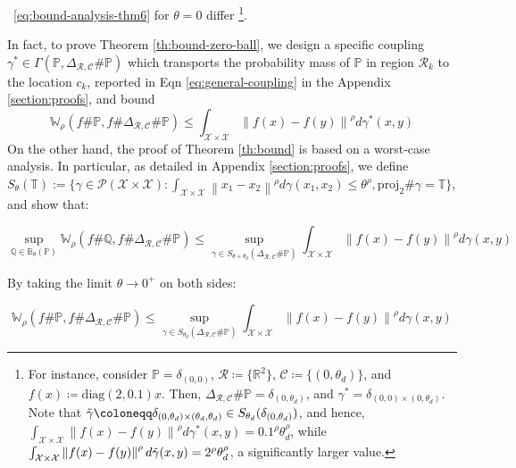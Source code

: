 \documentclass[11pt, a4paper, oneside,reqno]{amsart}
\theoremstyle{plain}
\def\prob{\mathbb{P}}
\def\probQ{\mathbb{Q}}
\def\wasserstein{{\mathbb{W}}}
\newcommand{\norm}[1]{\left\lVert#1\right\rVert}
\def\realNum{{\mathbb{R}}}
\def\sP{{\mathcal{P}}}
\def\sR{{\mathcal{R}}}
\def\sX{{\mathcal{X}}}
\def\bsR{{\bm{\mathcal{R}}}}
\def\bsC{{\bm{\mathcal{C}}}}
\begin{document}
~\eqref{eq:bound-analysis-thm6} for $\theta=0$ differ
\footnote{For instance, consider $\prob = \delta_{(0,0)}$, $\bsR \coloneqq \{ \realNum^2 \}$, $\bsC \coloneqq \{ (0, \theta_d) \}$, and $f(x) \coloneqq \text{diag}(2, 0.1)x$. Then, $\Delta_{\bsR, \bsC}\#\prob = \delta_{(0, \theta_d)}$, and $\gamma^*=\delta_{(0,0)\times(0,\theta_d)}$. Note that $\Tilde{\gamma} \coloneqq \delta_{(0, \theta_d)\times(\theta_d, \theta_d)} \in S_{\theta_d}(\delta_{(0, \theta_d)})$, and hence, $\int_{\sX \times \sX} \norm{f(x)-f(y)}^\rho d\gamma^*(x, y) = 0.1^\rho \theta_d^\rho$, while $\int_{\sX \times \sX} \norm{f(x)-f(y)}^\rho d\Tilde{\gamma}(x, y) = 2^\rho \theta_d^\rho$, a significantly larger value.}.

\iffalse
  In fact, to prove Theorem \ref{th:bound-zero-ball}, we design a specific coupling $\gamma^* \in \Gamma(\prob, \Delta_{\bsR, \bsC}\#\prob)$ which transports the probability mass of $\prob$ in region $\sR_k$ to the location $c_k$, reported in Eqn \eqref{eq:general-coupling} in the Appendix \ref{section:proofs}, and bound
    \begin{equation}\label{eq:bound-analysis-thm6}
        \wasserstein_\rho(f\#\prob, f\#\Delta_{\bsR, \bsC}\#\prob) \leq \int_{\sX \times \sX} \norm{f(x)-f(y)}^\rho d\gamma^*(x, y)
    \end{equation}
    On the other hand, the proof of Theorem \ref{th:bound} is based on a worst-case analysis. In particular, as detailed in Appendix \ref{section:proofs}, we define $ S_\theta(\mathbb{T}) := \Big\{ \gamma \in \sP(\sX \times \sX) : \int_{\sX \times \sX} \norm{x_1 - x_2}^\rho d\gamma(x_1, x_2) \leq \theta^\rho, \text{proj}_2 \# \gamma = \mathbb{T} \Big\}$, and show that:

    \begin{equation*}
        \sup_{\probQ \in \mathbb{B}_{\theta}(\prob)}\wasserstein_\rho(f\#\probQ, f\#\Delta_{\bsR, \bsC}\#\prob) \leq \sup_{\gamma \in S_{\theta+\theta_d}(\Delta_{\bsR, \bsC}\#\prob)} \int_{\sX \times \sX} \norm{f(x)-f(y)}^\rho d\gamma(x, y)
    \end{equation*}

    By taking the limit $\theta \to 0^+$ on both sides:

    \begin{equation}\label{eq:bound-analysis-thm4}
        \wasserstein_\rho(f\#\prob, f\#\Delta_{\bsR, \bsC}\#\prob) \leq \sup_{\gamma \in S_{\theta_d}(\Delta_{\bsR, \bsC}\#\prob)} \int_{\sX \times \sX} \norm{f(x)-f(y)}^\rho d\gamma(x, y)
    \end{equation}
\end{document}
